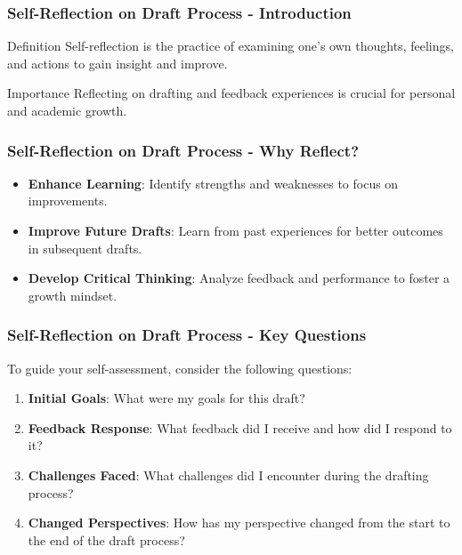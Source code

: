 \documentclass[aspectratio=169]{beamer}
\begin{document}
\begin{frame}[fragile]
    \frametitle{Self-Reflection on Draft Process - Introduction}
    \begin{block}{Definition}
        Self-reflection is the practice of examining one’s own thoughts, feelings, and actions to gain insight and improve.
    \end{block}
    \begin{block}{Importance}
        Reflecting on drafting and feedback experiences is crucial for personal and academic growth.
    \end{block}
\end{frame}

\begin{frame}[fragile]
    \frametitle{Self-Reflection on Draft Process - Why Reflect?}
    \begin{itemize}
        \item \textbf{Enhance Learning}: Identify strengths and weaknesses to focus on improvements.
        \item \textbf{Improve Future Drafts}: Learn from past experiences for better outcomes in subsequent drafts.
        \item \textbf{Develop Critical Thinking}: Analyze feedback and performance to foster a growth mindset.
    \end{itemize}
\end{frame}

\begin{frame}[fragile]
    \frametitle{Self-Reflection on Draft Process - Key Questions}
    To guide your self-assessment, consider the following questions:
    \begin{enumerate}
        \item \textbf{Initial Goals}: What were my goals for this draft?
        \item \textbf{Feedback Response}: What feedback did I receive and how did I respond to it?
        \item \textbf{Challenges Faced}: What challenges did I encounter during the drafting process?
        \item \textbf{Changed Perspectives}: How has my perspective changed from the start to the end of the draft process?
    \end{enumerate}
\end{frame}
\end{document}
